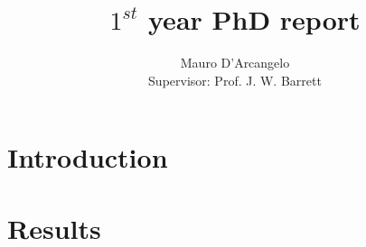 \documentclass[12pt,a4paper]{article}
\title{$1^{st}$ year PhD report}
\author{Mauro D'Arcangelo \\ Supervisor: Prof. J. W. Barrett}
\date{}
\begin{document}
\maketitle


\tableofcontents
\newpage

\section{Introduction}\label{intro}

\newpage

\section{Results}\label{results}

\newpage

\newpage

\newpage

%
%
%


\end{document}
